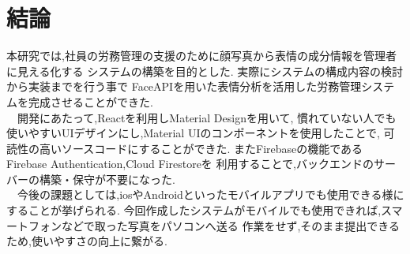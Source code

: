 \chapter{結論}
\label {chp:tex_basic}
本研究では,社員の労務管理の支援のために顔写真から表情の成分情報を管理者に見える化する
システムの構築を目的とした. 実際にシステムの構成内容の検討から実装までを行う事で
FaceAPIを用いた表情分析を活用した労務管理システムを完成させることができた. \\
　開発にあたって,Reactを利用しMaterial Designを用いて,
慣れていない人でも使いやすいUIデザインにし,Material UIのコンポーネントを使用したことで,
可読性の高いソースコードにすることができた.
またFirebaseの機能である Firebase Authentication,Cloud Firestoreを
利用することで,バックエンドのサーバーの構築・保守が不要になった. \\
　今後の課題としては,iosやAndroidといったモバイルアプリでも使用できる様にすることが挙げられる.
今回作成したシステムがモバイルでも使用できれば,スマートフォンなどで取った写真をパソコンへ送る
作業をせず,そのまま提出できるため,使いやすさの向上に繋がる.
